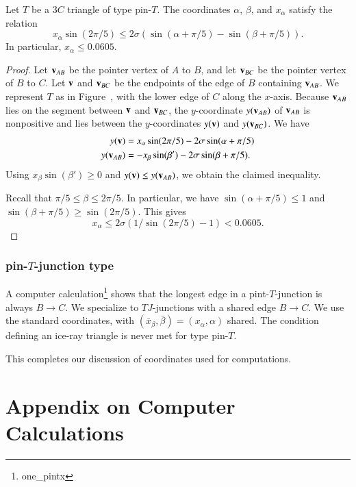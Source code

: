 
\begin{lemma}
  Let $T$ be a $3C$ triangle of type pin-$T$.  The coordinates
  $\alpha$, $\beta$, and $x_\alpha$ satisfy the relation
\[
x_\alpha \sin(2\pi/5) \le 2\sigma (\sin(\alpha+\pi/5) - \sin(\beta+\pi/5)).
\]
In particular, $x_\alpha \le 0.0605$.
\end{lemma}

\begin{proof} Let ${\mathbf v}_{AB}$ be the pointer vertex of $A$ to $B$, and
  let ${\mathbf v}_{BC}$ be the pointer vertex of $B$ to $C$.  Let ${\mathbf v}$ and
  ${\mathbf v}_{BC}$ be the endpoints of the edge of $B$ containing ${\mathbf v}_{AB}$.
  We represent $T$ as in Figure~, with the lower edge of
  $C$ along the $x$-axis.  Because ${\mathbf v}_{AB}$ lies on the segment between
  ${\mathbf v}$ and ${\mathbf v}_{BC}$, the $y$-coordinate $y({\mathbf v}_{AB})$ of ${\mathbf v}_{AB}$ is
  nonpositive and lies between the $y$-coordinates $y({\mathbf v})$ and
  $y({\mathbf v}_{BC})$.  We have
\begin{align*}
y({\mathbf v}) &= x_\alpha \sin(2\pi/5) - 2\sigma\sin(\alpha+\pi/5)\\
y({\mathbf v}_{AB}) & = -x_\beta \sin(\beta') - 2\sigma\sin(\beta+\pi/5).
\end{align*}
Using $x_\beta \sin(\beta')\ge 0$ and $y({\mathbf v}) \le y({\mathbf v}_{AB})$, we
obtain the claimed inequality.

Recall that $\pi/5\le \beta \le 2\pi/5$.  In particular, we have
$\sin(\alpha+\pi/5) \le 1$ and $\sin(\beta+\pi/5)\ge \sin(2\pi/5)$.
This gives
\[
x_\alpha \le 2\sigma(1/\sin(2\pi/5) - 1) < 0.0605.
\]
\end{proof}

\subsubsection{pin-$T$-junction type}

A computer calculation\footnote{one\_pintx} shows that the longest
edge in a pint-$T$-junction is always $B\to C$.  We specialize to
$TJ$-junctions with a shared edge $B\to C$.  We use the standard
coordinates, with $(\bar x_\beta,\bar\beta)=(x_\alpha,\alpha)$ shared.
The condition defining an ice-ray triangle is never met for type
pin-$T$.


This completes our discussion of coordinates used for computations.

\section{Appendix on Computer Calculations}

